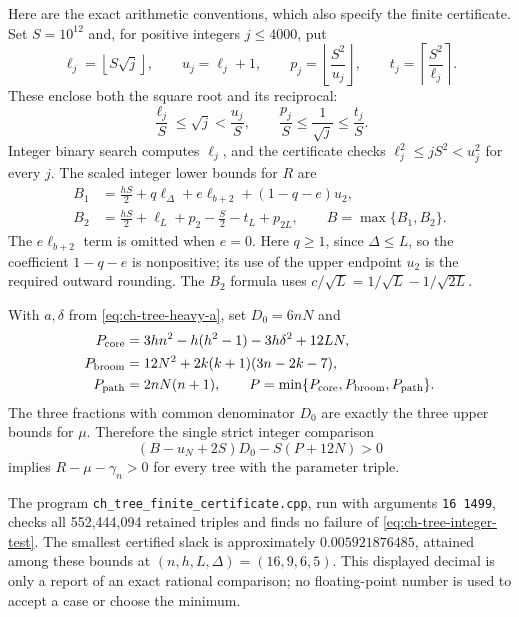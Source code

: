 \documentclass[11pt,a4paper]{article}
\theoremstyle{remark}
\numberwithin{equation}{section}
\begin{document}
Here are the exact arithmetic conventions, which also specify the finite
certificate. Set $S=10^{12}$ and, for positive integers $j\le4000$, put
\[
 \ell_j=\left\lfloor S\sqrt j\right\rfloor,
 \qquad u_j=\ell_j+1,
 \qquad p_j=\left\lfloor\frac{S^2}{u_j}\right\rfloor,
 \qquad t_j=\left\lceil\frac{S^2}{\ell_j}\right\rceil.
\]
These enclose both the square root and its reciprocal:
\[
 \frac{\ell_j}{S}\le\sqrt j<\frac{u_j}{S},\qquad
 \frac{p_j}{S}\le\frac1{\sqrt j}\le\frac{t_j}{S}.
\]
Integer binary search computes $\ell_j$, and the certificate checks
$\ell_j^2\le jS^2<u_j^2$ for every $j$.
The scaled integer lower bounds for $R$ are
\begin{align*}
 B_1&=\frac{hS}{2}+q\ell_\Delta+e\ell_{b+2}
                                      +(1-q-e)u_2,\\
 B_2&=\frac{hS}{2}+\ell_L+p_2-\frac S2-t_L+p_{2L},
 \qquad B=\max\{B_1,B_2\}.
\end{align*}
The $e\ell_{b+2}$ term is omitted when $e=0$.
Here $q\ge1$, since $\Delta\le L$, so the coefficient $1-q-e$ is
nonpositive; its use of the upper endpoint $u_2$ is the required outward
rounding. The $B_2$ formula uses
$c/\sqrt L=1/\sqrt L-1/\sqrt{2L}$.

With $a,\delta$ from \eqref{eq:ch-tree-heavy-a}, set $D_0=6nN$ and
\begin{align*}
 P_{\rm core}&=3hn^2-h(h^2-1)-3h\delta^2+12LN,\\
 P_{\rm broom}&=12N^2+2k(k+1)(3n-2k-7),\\
 P_{\rm path}&=2nN(n+1),\qquad
 P=\min\{P_{\rm core},P_{\rm broom},P_{\rm path}\}.
\end{align*}
The three fractions with common denominator $D_0$ are exactly the three
upper bounds for $\mu$. Therefore the single strict integer comparison
\begin{equation}\label{eq:ch-tree-integer-test}
             (B-u_N+2S)D_0-S(P+12N)>0
\end{equation}
implies $R-\mu-\gamma_n>0$ for every tree with the parameter triple.

The program \texttt{ch\_tree\_finite\_certificate.cpp}, run with
arguments \texttt{16 1499}, checks all 552,444,094 retained triples and
finds no failure of \eqref{eq:ch-tree-integer-test}. The smallest
certified slack is approximately $0.005921876485$, attained among these
bounds at $(n,h,L,\Delta)=(16,9,6,5)$. This displayed decimal is only a
report of an exact rational comparison; no floating-point number is
used to accept a case or choose the minimum.
\end{document}
